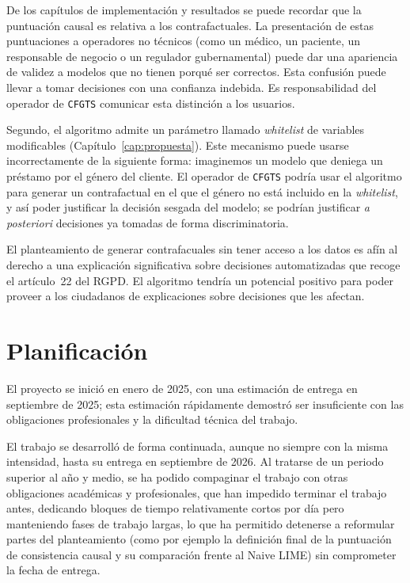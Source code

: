 \documentclass[12pt]{report} %
\begin{document}
De los capítulos de implementación y resultados se puede recordar que la puntuación causal es relativa a los contrafactuales. La presentación de estas puntuaciones a operadores no técnicos (como un médico, un paciente, un responsable de negocio o un regulador gubernamental) puede dar una apariencia de validez a modelos que no tienen porqué ser correctos. Esta confusión puede llevar a tomar decisiones con una confianza indebida. Es responsabilidad del operador de \texttt{CFGTS} comunicar esta distinción a los usuarios.

Segundo, el algoritmo admite un parámetro llamado \textit{whitelist} de variables modificables (Capítulo~\ref{cap:propuesta}). Este mecanismo puede usarse incorrectamente de la siguiente forma: imaginemos un modelo que deniega un préstamo por el género del cliente. El operador de \texttt{CFGTS} podría usar el algoritmo para generar un contrafactual en el que el género no está incluido en la \textit{whitelist}, y así poder justificar la decisión sesgada del modelo; se podrían justificar \textit{a posteriori} decisiones ya tomadas de forma discriminatoria.

El planteamiento de generar contrafacuales sin tener acceso a los datos es afín al derecho a una explicación significativa sobre decisiones automatizadas que recoge el artículo~22 del RGPD. El algoritmo tendría un potencial positivo para poder proveer a los ciudadanos de explicaciones sobre decisiones que les afectan.


\chapter{Planificación}
\label{cap:planificacion}

El proyecto se inició en enero de 2025, con una estimación de entrega en septiembre de 2025; esta estimación rápidamente demostró ser insuficiente con las obligaciones profesionales y la dificultad técnica del trabajo.

El trabajo se desarrolló de forma continuada, aunque no siempre con la misma intensidad, hasta su entrega en septiembre de 2026. Al tratarse de un periodo superior al año y medio, se ha podido compaginar el trabajo con otras obligaciones académicas y profesionales, que han impedido terminar el trabajo antes, dedicando bloques de tiempo relativamente cortos por día pero manteniendo fases de trabajo largas, lo que ha permitido detenerse a reformular partes del planteamiento (como por ejemplo la definición final de la puntuación de consistencia causal y su comparación frente al Naive LIME) sin comprometer la fecha de entrega.
\end{document}
